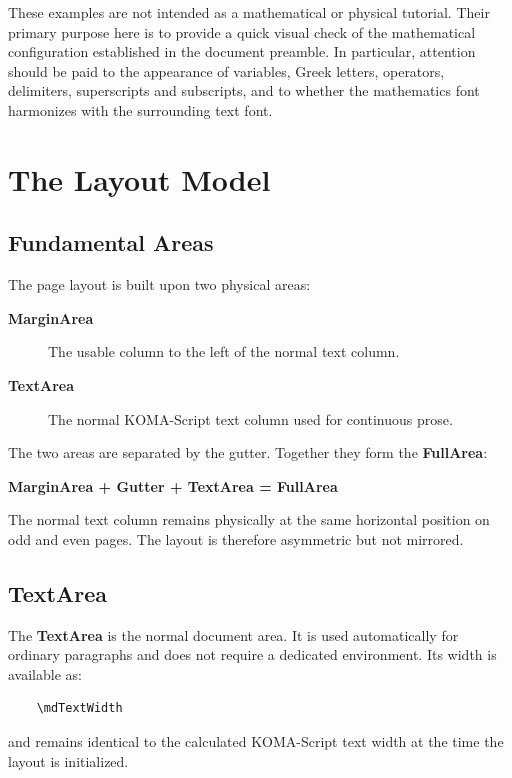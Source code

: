 \documentclass[
11pt,
a4paper,
oneside
]{scrbook}
\begin{document}
These examples are not intended as a mathematical or physical tutorial. Their primary purpose here is to provide a quick visual check of the mathematical configuration established in the document preamble. In particular, attention should be paid to the appearance of variables, Greek letters, operators, delimiters, superscripts and subscripts, and to whether the mathematics font harmonizes with the surrounding text font.


\chapter{The Layout Model}
\label{chap:layout-model}

\section{Fundamental Areas}
The page layout is built upon two physical areas:
\begin{description}
	\item[\textbf{MarginArea}]
	The usable column to the left of the normal text column.
	
	\item[\textbf{TextArea}]
	The normal KOMA-Script text column used for continuous prose.
\end{description}
The two areas are separated by the gutter.
Together they form the \textbf{FullArea}:
\begin{note}
	\textbf{MarginArea + Gutter + TextArea = FullArea}
\end{note}
The normal text column remains physically at the same horizontal position on
odd and even pages.
The layout is therefore asymmetric but not mirrored.

\section{TextArea}

The \textbf{TextArea} is the normal document area.
It is used automatically for ordinary paragraphs and does not require a
dedicated environment.
Its width is available as:
\begin{verbatim}
	\mdTextWidth
\end{verbatim}
and remains identical to the calculated KOMA-Script text width at the time
the layout is initialized.
\end{document}
